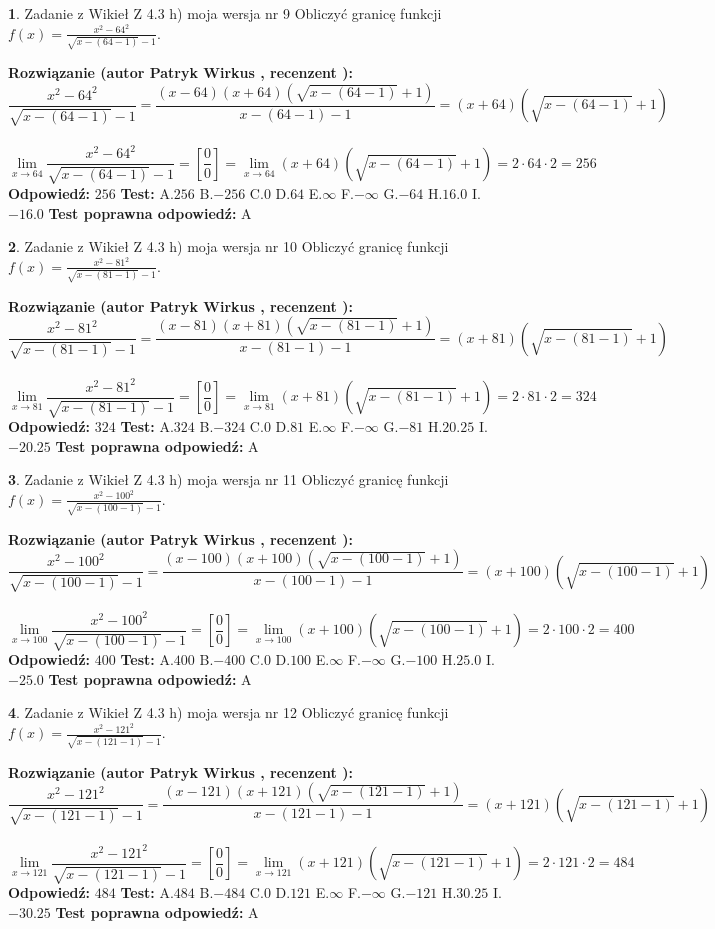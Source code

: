 \documentclass[12pt, a4paper]{article}
\theoremstyle{definition} %
\newtheorem{zad}{}
\newcommand{\zadStart}[1]{\begin{zad}#1\newline}
\newcommand{\zadStop}{\end{zad}}
\newcommand{\rozwStart}[2]{\noindent \textbf{Rozwiązanie (autor #1 , recenzent #2): }\newline}
\newcommand{\rozwStop}{\newline}
\newcommand{\odpStart}{\noindent \textbf{Odpowiedź:}\newline}
\newcommand{\odpStop}{\newline}
\newcommand{\testStart}{\noindent \textbf{Test:}\newline}
\newcommand{\testStop}{\newline}
\newcommand{\kluczStart}{\noindent \textbf{Test poprawna odpowiedź:}\newline}
\newcommand{\kluczStop}{\newline}
\begin{document}
\zadStart{Zadanie z Wikieł Z 4.3 h) moja wersja nr 9}
Obliczyć granicę funkcji $f(x)=\frac{x^{2} - 64^{2}}{\sqrt{x-(64-1)}-1}$.
\zadStop
\rozwStart{Patryk Wirkus}{}
$$\frac{x^{2} - 64^{2}}{\sqrt{x-(64-1)}-1}=\frac{(x-64)(x+64)(\sqrt{x-(64-1)}+1)}{x-(64-1)-1}=(x+64)(\sqrt{x-(64-1)}+1)$$
\\
$$\lim\limits_{x\to 64}\frac{x^{2} - 64^{2}}{\sqrt{x-(64-1)}-1}=[\frac{0}{0}]=
\lim\limits_{x\to 64}(x+64)(\sqrt{x-(64-1)}+1) = 2\cdot64 \cdot 2 = 256$$
\rozwStop
\odpStart
$256$
\odpStop
\testStart
A.$256$
B.$-256$
C.$0$
D.$64$
E.$\infty$
F.$-\infty$
G.$-64$
H.$16.0$
I.$-16.0$
\testStop
\kluczStart
A
\kluczStop



\zadStart{Zadanie z Wikieł Z 4.3 h) moja wersja nr 10}
Obliczyć granicę funkcji $f(x)=\frac{x^{2} - 81^{2}}{\sqrt{x-(81-1)}-1}$.
\zadStop
\rozwStart{Patryk Wirkus}{}
$$\frac{x^{2} - 81^{2}}{\sqrt{x-(81-1)}-1}=\frac{(x-81)(x+81)(\sqrt{x-(81-1)}+1)}{x-(81-1)-1}=(x+81)(\sqrt{x-(81-1)}+1)$$
\\
$$\lim\limits_{x\to 81}\frac{x^{2} - 81^{2}}{\sqrt{x-(81-1)}-1}=[\frac{0}{0}]=
\lim\limits_{x\to 81}(x+81)(\sqrt{x-(81-1)}+1) = 2\cdot81 \cdot 2 = 324$$
\rozwStop
\odpStart
$324$
\odpStop
\testStart
A.$324$
B.$-324$
C.$0$
D.$81$
E.$\infty$
F.$-\infty$
G.$-81$
H.$20.25$
I.$-20.25$
\testStop
\kluczStart
A
\kluczStop



\zadStart{Zadanie z Wikieł Z 4.3 h) moja wersja nr 11}
Obliczyć granicę funkcji $f(x)=\frac{x^{2} - 100^{2}}{\sqrt{x-(100-1)}-1}$.
\zadStop
\rozwStart{Patryk Wirkus}{}
$$\frac{x^{2} - 100^{2}}{\sqrt{x-(100-1)}-1}=\frac{(x-100)(x+100)(\sqrt{x-(100-1)}+1)}{x-(100-1)-1}=(x+100)(\sqrt{x-(100-1)}+1)$$
\\
$$\lim\limits_{x\to 100}\frac{x^{2} - 100^{2}}{\sqrt{x-(100-1)}-1}=[\frac{0}{0}]=
\lim\limits_{x\to 100}(x+100)(\sqrt{x-(100-1)}+1) = 2\cdot100 \cdot 2 = 400$$
\rozwStop
\odpStart
$400$
\odpStop
\testStart
A.$400$
B.$-400$
C.$0$
D.$100$
E.$\infty$
F.$-\infty$
G.$-100$
H.$25.0$
I.$-25.0$
\testStop
\kluczStart
A
\kluczStop



\zadStart{Zadanie z Wikieł Z 4.3 h) moja wersja nr 12}
Obliczyć granicę funkcji $f(x)=\frac{x^{2} - 121^{2}}{\sqrt{x-(121-1)}-1}$.
\zadStop
\rozwStart{Patryk Wirkus}{}
$$\frac{x^{2} - 121^{2}}{\sqrt{x-(121-1)}-1}=\frac{(x-121)(x+121)(\sqrt{x-(121-1)}+1)}{x-(121-1)-1}=(x+121)(\sqrt{x-(121-1)}+1)$$
\\
$$\lim\limits_{x\to 121}\frac{x^{2} - 121^{2}}{\sqrt{x-(121-1)}-1}=[\frac{0}{0}]=
\lim\limits_{x\to 121}(x+121)(\sqrt{x-(121-1)}+1) = 2\cdot121 \cdot 2 = 484$$
\rozwStop
\odpStart
$484$
\odpStop
\testStart
A.$484$
B.$-484$
C.$0$
D.$121$
E.$\infty$
F.$-\infty$
G.$-121$
H.$30.25$
I.$-30.25$
\testStop
\kluczStart
A
\kluczStop
\end{document}
